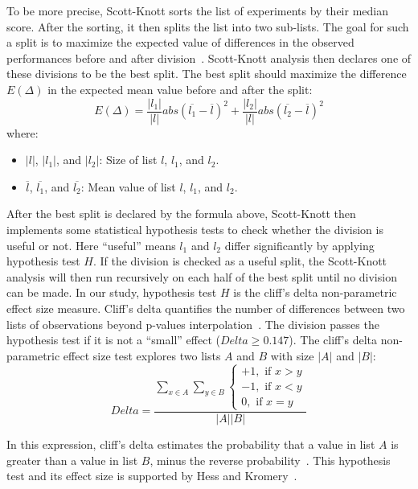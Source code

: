 \documentclass[]{svjour3}
\begin{document}
To be more precise, Scott-Knott sorts the list of experiments by their median score. After the sorting, it then splits the list into two sub-lists. The goal for such a split is to maximize the expected value of differences in the observed performances before and after division~\cite{xia2018hyperparameter}. Scott-Knott analysis then declares one of these divisions to be the best split. The best split should maximize the difference $E(\Delta)$ in the expected mean value before and after the split:
\begin{equation}
    E(\Delta) = \frac{|l_1|}{|l|}abs(\overline{l_1} - \overline{l})^2 + \frac{|l_2|}{|l|}abs(\overline{l_2} - \overline{l})^2
\end{equation}
where:
\begin{itemize}
    \item
    $|l|$, $|l_1|$, and $|l_2|$: Size of list $l$, $l_1$, and $l_2$.
    \item
    $\overline{l}$, $\overline{l_1}$, and $\overline{l_2}$: Mean value of list $l$, $l_1$, and $l_2$.
\end{itemize}
After the best split is declared by the formula above, Scott-Knott then implements some statistical hypothesis tests to check whether the division is useful or not. Here ``useful'' means $l_1$ and $l_2$ differ significantly by applying hypothesis test $H$. If the division is checked as a useful split, the Scott-Knott analysis will then run recursively on each half of the best split until no division can be made. In our study, hypothesis test $H$ is the cliff's delta non-parametric effect size measure. Cliff's delta quantifies the number of differences between two lists of observations beyond p-values interpolation~\cite{macbeth2011cliff}. The division passes the hypothesis test if it is not a ``small'' effect ($Delta \geq 0.147$). The cliff's delta non-parametric effect size test explores two lists $A$ and $B$ with size $|A|$ and $|B|$:
\begin{equation}
    Delta = \frac{\sum\limits_{x \in A} \sum\limits_{y \in B} \left\{ \begin{array}{l} +1, \mbox{  if $x > y$}\\
                    -1, \mbox{   if $x < y$}\\
                     0,  \mbox{   if $x = y$}
                \end{array} \right.}{|A||B|}
\end{equation}

In this expression, cliff's delta estimates the probability that a value in list $A$ is greater than a value in list $B$, minus the reverse probability~\cite{macbeth2011cliff}. This hypothesis test and its effect size is supported by Hess and Kromery~\cite{hess2004robust}.
\end{document}
